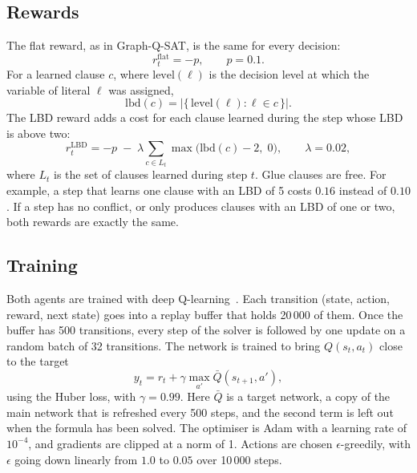 \documentclass[11pt,a4paper]{article}
\begin{document}
\subsection{Rewards}

The flat reward, as in Graph-Q-SAT, is the same for every decision:
\begin{equation}
    r_t^{\mathrm{flat}} = -p, \qquad p = 0.1 .
    \label{eq:flat_reward}
\end{equation}
For a learned clause $c$, where $\mathrm{level}(\ell)$ is the decision level at which the variable of literal $\ell$ was assigned,
\begin{equation}
    \mathrm{lbd}(c) = \big|\{\, \mathrm{level}(\ell) : \ell \in c \,\}\big| .
    \label{eq:lbd}
\end{equation}
The LBD reward adds a cost for each clause learned during the step whose LBD is above two:
\begin{equation}
    r_t^{\mathrm{LBD}} = -p \;-\; \lambda \sum_{c \in L_t} \max\big(\mathrm{lbd}(c) - 2,\; 0\big), \qquad \lambda = 0.02 ,
    \label{eq:lbd_reward}
\end{equation}
where $L_t$ is the set of clauses learned during step $t$. Glue clauses are free. For example, a step that learns one clause with an LBD of 5 costs $0.16$ instead of $0.10$. If a step has no conflict, or only produces clauses with an LBD of one or two, both rewards are exactly the same.

\subsection{Training}

Both agents are trained with deep Q-learning~\cite{mnih2015dqn}. Each transition (state, action, reward, next state) goes into a replay buffer that holds 20\,000 of them. Once the buffer has 500 transitions, every step of the solver is followed by one update on a random batch of 32 transitions. The network is trained to bring $Q(s_t, a_t)$ close to the target
\begin{equation}
    y_t = r_t + \gamma \max_{a'} \bar{Q}(s_{t+1}, a'),
    \label{eq:target}
\end{equation}
using the Huber loss, with $\gamma = 0.99$. Here $\bar{Q}$ is a target network, a copy of the main network that is refreshed every 500 steps, and the second term is left out when the formula has been solved. The optimiser is Adam with a learning rate of $10^{-4}$, and gradients are clipped at a norm of 1. Actions are chosen $\epsilon$-greedily, with $\epsilon$ going down linearly from $1.0$ to $0.05$ over 10\,000 steps.
\end{document}
